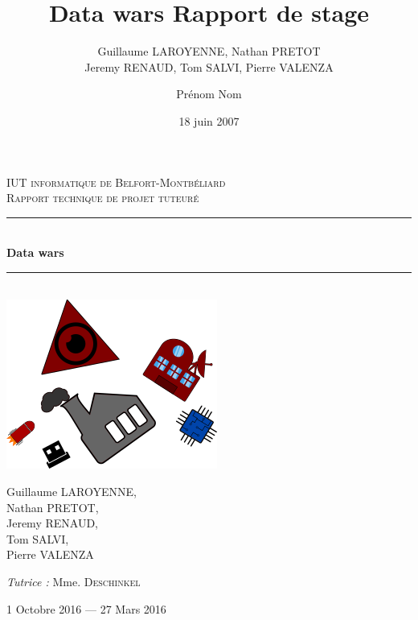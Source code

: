 \documentclass[a4paper, titlepage]{livret}
\title{Data wars }
\author{Guillaume LAROYENNE, Nathan PRETOT \\ Jeremy RENAUD, Tom SALVI, Pierre VALENZA}
\title{Rapport de stage}      %
\author{Prénom Nom}           %
\date{18 juin 2007}           %
\newcommand{\HRule}{\rule{\linewidth}{0.5mm}}
\begin{document}
\begin{titlepage}
  \begin{sffamily}
  \begin{center}


    \textsc{\LARGE IUT informatique de Belfort-Montbéliard}\\[2cm]

    \textsc{\Large Rapport technique de projet tuteuré}\\[1.5cm]

    \HRule \\[0.4cm]
    { \huge \bfseries Data wars\\[0.4cm] }

    \HRule \\[2cm]
    \includegraphics[scale=0.4]{../mainPageimg.png}
    \\[2cm]

    \begin{minipage}{0.4\textwidth}
      \begin{flushleft} \large
        Guillaume \textsc{LAROYENNE}, \\ Nathan \textsc{PRETOT}, \\ Jeremy \textsc{RENAUD}, \\ Tom \textsc{SALVI}, \\ Pierre \textsc{VALENZA}
      \end{flushleft}
    \end{minipage}
    \begin{minipage}{0.4\textwidth}
      \begin{flushright} \large
        \emph{Tutrice :} Mme. \textsc{Deschinkel} \\
      \end{flushright}
    \end{minipage}

    \vfill

    {\large 1\ier{} Octobre 2016 — 27 Mars 2016}

  \end{center}
  \end{sffamily}
\end{titlepage}
\end{document}
